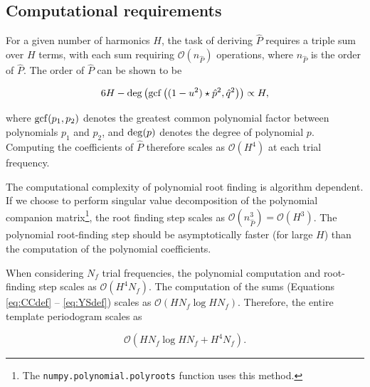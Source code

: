 \documentclass[apj]{emulateapj}
\newcommand{\bigO}{\mathcal{O}}
\begin{document}
\subsection{Computational requirements}\label{sec:compreqs}

For a given number of harmonics $H$, the task of deriving 
$\hat{P}$ requires a triple sum over $H$ terms, with each sum
requiring $\bigO(n_{\hat{P}})$ operations, where $n_{\hat{P}}$ is the order
of $\hat{P}$. The order of $\hat{P}$ can be shown to be

\begin{equation}
6H - {\rm deg}\left({\rm gcf}\left((1 - u^2)\star\hat{p}^2, \hat{q}^2\right)\right) \propto H,
\end{equation}

\noindent where ${\rm gcf}(p_1, p_2)$ denotes the greatest common polynomial factor
between polynomials $p_1$ and $p_2$, and ${\rm deg}(p)$ denotes the degree of polynomial $p$. 
Computing the coefficients of $\hat{P}$ therefore scales as $\bigO(H^4)$ at each trial frequency. 

The computational complexity of polynomial root finding
is algorithm dependent. If we choose to perform singular value decomposition of
the polynomial companion matrix\footnote{The \texttt{numpy.polynomial.polyroots} 
function uses this method.}, the root finding step scales as 
$\bigO(n_{\hat{P}}^3) = \bigO(H^3)$. The polynomial root-finding step 
should be asymptotically faster (for large $H$) than the computation of 
the polynomial coefficients.

When considering $N_f$ trial frequencies, the polynomial computation and root-finding 
step scales as $\bigO(H^4N_f)$. The computation of the sums 
(Equations \ref{eq:CCdef} -- \ref{eq:YSdef}) scales as $\bigO(HN_f\log HN_f)$.
Therefore, the entire template periodogram scales as 

\begin{equation}
\bigO(HN_f \log HN_f + H^4N_f).
\end{equation}
\end{document}
